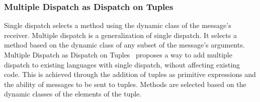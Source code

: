 \subsubsection{Multiple Dispatch as Dispatch on Tuples}
Single dispatch selects a method using
the dynamic class of the message's receiver.
Multiple dispatch is a generalization of single dispatch.
It selects a method based on the dynamic class
of any subset of the message's arguments.
Multiple Dispatch as Dispatch on Tuples~\cite{multidispatch-tuple}
proposes a way to add multiple dispatch
to existing languages with single dispatch,
wihout affecting existing code.
This is achieved through the addition
of tuples as primitive expressions
and the ability of messages to be sent to tuples.
Methods are selected based on the dynamic classes
of the elements of the tuple.



